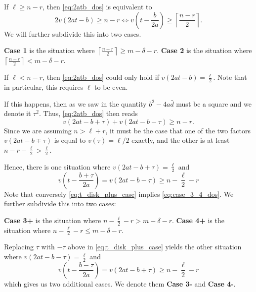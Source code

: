 \begin{itemize}
  \ii If $\ell \ge n-r$, then \eqref{eq:2atb_dos} is equivalent to
  \begin{equation}
    2v(2at-b) \ge n-r
    \iff v\left( t - \frac{b}{2a} \right) \ge \left\lceil \frac{n-r}{2} \right\rceil.
    \label{eq:t_disk_case_1_2}
  \end{equation}
  We will further subdivide this into two cases.
  \begin{itemize}
    \ii \textbf{Case 1} is the situation where $\left\lceil \frac{n-r}{2} \right\rceil \ge m - \delta - r$.
    \ii \textbf{Case 2} is the situation where $\left\lceil \frac{n-r}{2} \right\rceil < m - \delta - r$.
  \end{itemize}

  \ii If $\ell < n-r$, then \eqref{eq:2atb_dos} could only hold if $v(2at-b) = \frac{\ell}{2}$.
  Note that in particular, this requires $\ell$ to be even.

  If this happens, then as we saw in 
  the quantity $b^2 - 4 a \bar d$ must be a square and we denote it $\tau^2$.
  Thus, \eqref{eq:2atb_dos} then reads
  \begin{equation}
    v(2at-b+\tau) + v(2at-b-\tau) \ge n-r.
    \label{eq:case_3_4_dos}
  \end{equation}
  Since we are assuming $n > \ell + r$,
  it must be the case that one of the two factors
  $v(2at-b\mp\tau)$ is equal to $v(\tau) = \ell / 2$ exactly,
  and the other is at least $n - r - \frac{\ell}{2} > \frac{\ell}{2}$.

  Hence, there is one situation where $v(2at-b+\tau) = \frac{\ell}{2}$ and
  \begin{equation}
    v\left( t - \frac{b+\tau}{2a} \right) = v(2at-b-\tau) \ge n - \frac{\ell}{2} - r
    \label{eq:t_disk_plus_case}
  \end{equation}
  Note that conversely \eqref{eq:t_disk_plus_case} implies \eqref{eq:case_3_4_dos}.
  We further subdivide this into two cases:
  \begin{itemize}
    \ii \textbf{Case 3\ts+} is the situation where $n - \frac{\ell}{2} - r > m - \delta - r$.
    \ii \textbf{Case 4\ts+} is the situation where $n - \frac{\ell}{2} - r \le m - \delta - r$.
  \end{itemize}
  Replacing $\tau$ with $-\tau$ above in \eqref{eq:t_disk_plus_case} yields
  the other situation where $v(2at-b-\tau) = \frac{\ell}{2}$ and
  \begin{equation}
    v\left( t - \frac{b-\tau}{2a} \right) = v(2at-b+\tau) \ge n - \frac{\ell}{2} - r
    \label{eq:t_disk_minus_case}
  \end{equation}
  which gives us two additional cases.
  We denote them \textbf{Case 3\ts-} and \textbf{Case 4\ts-}.
\end{itemize}

